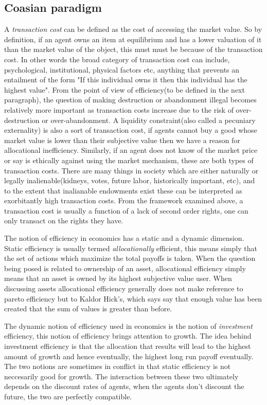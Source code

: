 \documentclass[12pt]{article}
\numberwithin{equation}{section}
\begin{document}
\subsection{Coasian paradigm}

A \textit{transaction cost} can be defined as the cost of accessing the market value. So by definition, if an agent owns an item at equilibrium and has a lower valuation of it than the market value of the object, this must must be because of the transaction cost. In other words the broad category of transaction cost can include, psychological, institutional, physical factors etc, anything that prevents an entailment of the form "If this individual owns it then this individual has the highest value". From the point of view of efficiency(to be defined in the next paragraph), the question of making destruction or abandonment illegal becomes relatively more important as transaction costs increase due to the risk of over-destruction or over-abandonment. A liquidity constraint(also called a pecuniary externality) is also a sort of transaction cost, if agents cannot buy a good whose market value is lower than their subjective value then we have a reason for allocational inefficiency. Similarly, if an agent does not know of the market price or say is ethically against using the market mechanism, these are both types of transaction costs. There are many things in society which are either naturally or legally inalienable(kidneys, votes, future labor, historically important, etc), and to the extent that inalianable endowments exist these can be interpreted as exorbitantly high transaction costs. From the framework examined above, a transaction cost is usually a function of a lack of second order rights, one can only transact on the rights they have. 

The notion of efficiency in economics has a static and a dynamic dimension. Static efficiency is usually termed \textit{allocationally} efficient, this means simply that the set of actions which maximize the total payoffs is taken. When the question being posed is related to ownership of an asset, allocational efficiency simply means that an asset is owned by its highest subjective value user. When discussing assets allocational efficiency generally does not make reference to pareto efficiency but to Kaldor Hick's, which says say that enough value has been created that the sum of values is greater than before. 

The dynamic notion of efficiency used in economics is the notion of \textit{investment} efficiency, this notion of efficiency brings attention to growth. The idea behind investment efficiency is that the allocation that results will lead to the highest amount of growth and hence eventually, the highest long run payoff eventually. The two notions are sometimes in conflict in that static efficiency is not neccesarily good for growth. The interaction between these two ultimately depends on the discount rates of agents, when the agents don't discount the future, the two are perfectly compatible. 
\end{document}
